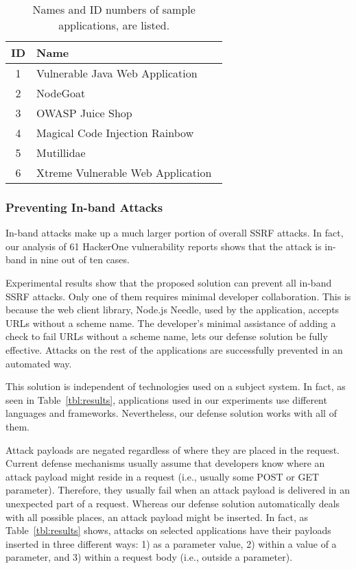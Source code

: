 \begin{table}
\begin{tabular}{c|l}
\hline
ID & Name\\
\hline
\hline
1 & Vulnerable Java Web Application~\cite{vjwa}\\
2 & NodeGoat~\cite{nodegoat}\\
3 & OWASP Juice Shop~\cite{juice}\\
4 & Magical Code Injection Rainbow~\cite{mcir}\\
5 & Mutillidae~\cite{mutillidae}\\
6 & Xtreme Vulnerable Web Application~\cite{xvwa}\\
\hline
\end{tabular}
\caption{Names and ID numbers of sample applications, are listed.}
\label{tbl:app_list}
\end{table}

\subsubsection{Preventing In-band Attacks}
In-band attacks make up a much larger portion of overall SSRF attacks. In fact, our analysis of 61 HackerOne vulnerability reports shows that the attack is in-band in nine out of ten cases. 

Experimental results show that the proposed solution can prevent all in-band SSRF attacks. Only one of them requires minimal developer collaboration. This is because the web client library, Node.js Needle, used by the application, accepts URLs without a scheme name. The developer's minimal assistance of adding a check to fail URLs without a scheme name, lets our defense solution be fully effective. Attacks on the rest of the applications are successfully prevented in an automated way. 

This solution is independent of technologies used on a subject system. In fact, as seen in Table~\ref{tbl:results}, applications used in our experiments use different languages and frameworks. Nevertheless, our defense solution works with all of them. %

Attack payloads are negated regardless of where they are placed in the request. Current defense mechanisms usually assume that developers know where an attack payload might reside in a request (i.e., usually some POST or GET parameter). Therefore, they usually fail when an attack payload is delivered in an unexpected part of a request. Whereas our defense solution automatically deals with all possible places, an attack payload might be inserted. In fact, as Table~\ref{tbl:results} shows, attacks on selected applications have their payloads inserted in three different ways: 1) as a parameter value, 2) within a value of a parameter, and 3) within a request body (i.e., outside a parameter). %

